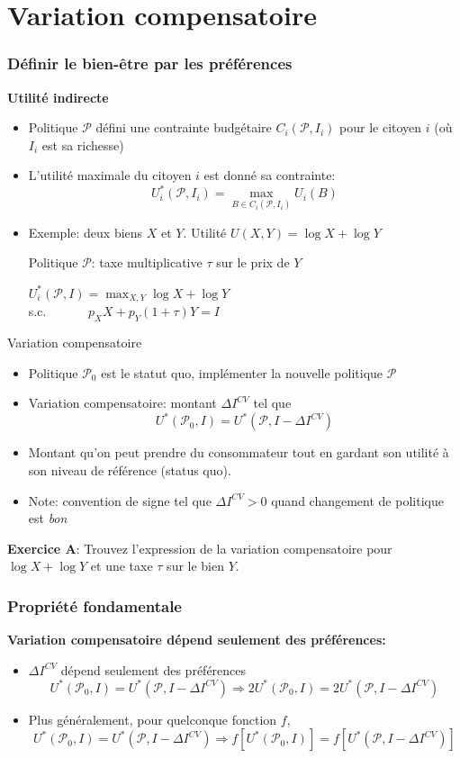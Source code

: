 \documentclass[handout]{beamer}
\newcommand{\mcl}{\mathcal}
\newcommand{\mdp}{\medskip \pause}
\begin{document}
\section{Variation compensatoire}

\begin{frame} \frametitle{Définir le bien-être par les préférences}
\textbf{Utilité indirecte} \begin{itemize}
\item
Politique $\mcl P$ défini une contrainte budgétaire $C_i(\mcl P,I_i)$ pour le citoyen $i$ (où $I_i$ est sa richesse)
\item L'utilité maximale du citoyen $i$ est donné sa contrainte: $$U_i^*(\mcl P,I_i) = \max_{B \in C_i(\mcl P, I_i)} U_i(B)$$
\item Exemple: deux biens $X$ et $Y$. Utilité $U(X,Y) = \log X + \log Y$ \medskip

Politique $\mcl P$: taxe multiplicative $\tau$ sur le prix de
$Y$\mdp

$U_i^*(\mcl P,I) = \max_{X,Y} \log X + \log Y$ \\ s.c. $\quad \quad \quad
p_X  X + p_Y(1 + \tau) Y = I$ \end{itemize}
\end{frame}

\begin{frame}{Variation compensatoire}
  \begin{itemize} \item Politique $\mcl P_0$ est le statut
quo, implémenter la nouvelle politique $\mcl P$ \item Variation compensatoire:  montant $\Delta I^{CV}$  tel que $$U^*(\mcl P_0,I) = U^*(\mcl P,
I - \Delta I^{CV})$$    \item    Montant qu'on peut prendre du consommateur tout en gardant son utilité à son niveau de référence (status quo).  

\item Note: convention de signe tel que  $\Delta I^{CV}>0$ quand changement de politique est \textit{bon} 

 \end{itemize}
 
 \textbf{Exercice A}: Trouvez l'expression de la variation compensatoire pour $\log X + \log Y$ et une taxe $\tau$ sur le bien $Y$. 
\end{frame}

\begin{frame} \frametitle{Propriété fondamentale}

\textbf{Variation compensatoire dépend seulement des préférences:} \begin{itemize} \item $\Delta I^{CV}$ dépend seulement des préférences $$U^*(\mcl P_0,I) = U^*(\mcl P, I - \Delta I^{CV})
\Rightarrow 2 U^*(\mcl P_0,I) = 2  U^*(\mcl P, I- \Delta I^{CV})$$ \item Plus généralement, pour quelconque fonction $f$, $$U^*(\mcl P_0,I) = U^*(\mcl P, I - \Delta I^{CV})
\Rightarrow f[U^*(\mcl P_0,I)] = f[ U^*(\mcl P, I - \Delta I^{CV})]$$\end{itemize}
 
\end{frame}
 
\end{document}
